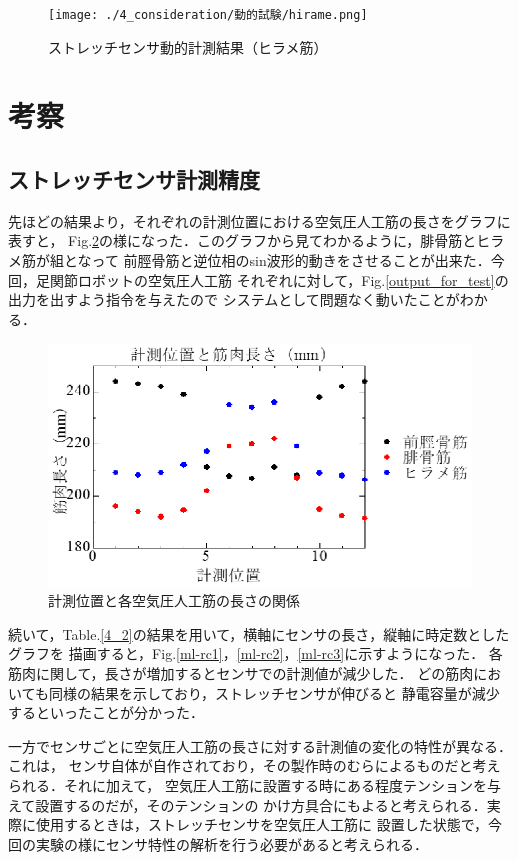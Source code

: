 \begin{figure}
  \texttt{[image: ./4\_consideration/動的試験/hirame.png]}
  \caption{ストレッチセンサ動的計測結果（ヒラメ筋）}
  \label{}
\end{figure}


\section{考察}
\subsection{ストレッチセンサ計測精度}
先ほどの結果より，それぞれの計測位置における空気圧人工筋の長さをグラフに表すと，
Fig.\ref{4-ml}の様になった．このグラフから見てわかるように，腓骨筋とヒラメ筋が組となって
前脛骨筋と逆位相のsin波形的動きをさせることが出来た．今回，足関節ロボットの空気圧人工筋
それぞれに対して，Fig.\ref{output_for_test}の出力を出すよう指令を与えたので
システムとして問題なく動いたことがわかる．

\begin{figure}[h]
    \begin{center}
        \includegraphics[width=0.78\columnwidth,clip]{4_consideration/ml.eps}
    \end{center}
    \caption{計測位置と各空気圧人工筋の長さの関係}
    \label{4-ml}
\end{figure}

\newpage

続いて，Table.\ref{4_2}の結果を用いて，横軸にセンサの長さ，縦軸に時定数としたグラフを
描画すると，Fig.\ref{ml-rc1}，\ref{ml-rc2}，\ref{ml-rc3}に示すようになった．
各筋肉に関して，長さが増加するとセンサでの計測値が減少した．
どの筋肉においても同様の結果を示しており，ストレッチセンサが伸びると
静電容量が減少するといったことが分かった．

一方でセンサごとに空気圧人工筋の長さに対する計測値の変化の特性が異なる．これは，
センサ自体が自作されており，その製作時のむらによるものだと考えられる．それに加えて，
空気圧人工筋に設置する時にある程度テンションを与えて設置するのだが，そのテンションの
かけ方具合にもよると考えられる．実際に使用するときは，ストレッチセンサを空気圧人工筋に
設置した状態で，今回の実験の様にセンサ特性の解析を行う必要があると考えられる．

